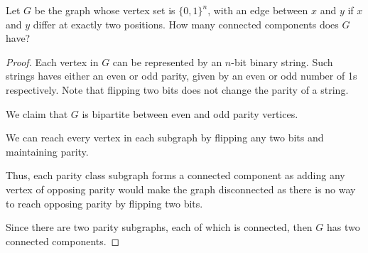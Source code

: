 \documentclass[../hw4]{subfiles}
\begin{document}
\begin{problem}
Let $G$ be the graph whose vertex set is $\{0,1\}^n$, with an edge between $x$ and $y$ if $x$ and $y$ differ at exactly two positions. How many connected components does $G$ have?
\end{problem}
\begin{proof}
	Each vertex in $G$ can be represented by an  $n$-bit binary string.
	Such strings haves either an even or odd parity, given by an even or odd number of 1s respectively.
	Note that flipping two bits does not change the parity of a string.

	We claim that $G$ is bipartite between even and odd parity vertices.

	We can reach every vertex in each subgraph by flipping any two bits and maintaining parity.

	Thus, each parity class subgraph forms a connected component as adding any vertex of opposing parity would make the graph disconnected as there is no way to reach opposing parity by flipping two bits.

	Since there are two parity subgraphs, each of which is connected, then $G$ has two connected components.
\end{proof}
\end{document}
